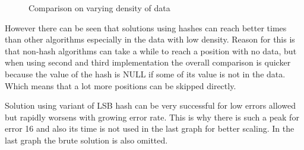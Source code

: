 \begin{figure}[h]
\begin{minipage}{.5\linewidth}
\centering
{}
\end{minipage}%
\begin{minipage}{.5\linewidth}
\centering
{}
\end{minipage}\par\medskip

\caption{Comparison on varying density of data}
\label{fig_densRes}
\end{figure}


However there can be seen that solutions using hashes can reach better times than other algorithms especially in the data with low density. Reason for this is that non-hash algorithms can take a while to reach a position with no data, but when using second and third implementation the overall comparison is quicker because the value of the hash is NULL if some of its value is not in the data. Which means that a lot more positions can be skipped directly.

Solution using variant of LSB hash can be very successful for low errors allowed but rapidly worsens with growing error rate. This is why there is such a peak for error 16 and also its time is not used in the last graph for better scaling. In the last graph the brute solution is also omitted.

